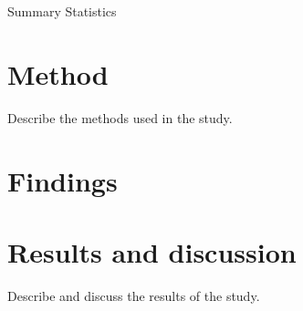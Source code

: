 \documentclass{article}
\begin{document}
\begin{table}[H]
	
	\caption{Summary Statistics}
\end{table}

\section{Method}
Describe the methods used in the study.

\section{Findings}

\begin{figure}[htbp]
	\centering
	
	\caption{}
\end{figure}

\begin{figure}[htbp]
	\centering
	
	\caption{}
\end{figure}

\begin{figure}[htbp]
	\centering
	
	\caption{}
\end{figure}


\section{Results and discussion}
Describe and discuss the results of the study.


\theendnotes



\end{document}
